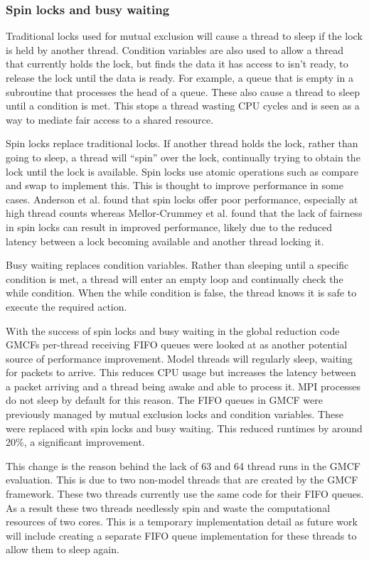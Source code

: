 \subsubsection{Spin locks and busy waiting}

Traditional locks used for mutual exclusion will cause a thread to sleep if the
lock is held by another thread. Condition variables are also used to allow a
thread that currently holds the lock, but finds the data it has access to isn't
ready, to release the lock until the data is ready. For example, a queue that is
empty in a subroutine that processes the head of a queue. These also cause a
thread to sleep until a condition is met. This stops a thread wasting CPU cycles
and is seen as a way to mediate fair access to a shared resource.

Spin locks replace traditional locks. If another thread holds the lock, rather
than going to sleep, a thread will ``spin'' over the lock, continually trying to
obtain the lock until the lock is available. Spin locks use atomic operations
such as compare and swap to implement this. This is thought to improve
performance in some cases. Anderson et al. \cite{Anderson1990} found that spin
locks offer poor performance, especially at high thread counts whereas
Mellor-Crummey et al. \cite{Mellor-Crummey1991} found that the lack of fairness
in spin locks can result in improved performance, likely due to the reduced
latency between a lock becoming available and another thread locking it.

Busy waiting replaces condition variables. Rather than sleeping until a specific
condition is met, a thread will enter an empty loop and continually check the
while condition. When the while condition is false, the thread knows it is safe
to execute the required action.

With the success of spin locks and busy waiting in the global reduction code
GMCFs per-thread receiving FIFO queues were looked at as another potential
source of performance improvement. Model threads will regularly sleep, waiting
for packets to arrive. This reduces CPU usage but increases the latency between
a packet arriving and a thread being awake and able to process it. MPI processes
do not sleep by default for this reason. The FIFO queues in GMCF were previously
managed by mutual exclusion locks and condition variables. These were replaced
with spin locks and busy waiting. This reduced runtimes by around 20\%, a
significant improvement.

This change is the reason behind the lack of 63 and 64 thread runs in the GMCF
evaluation. This is due to two non-model threads that are created by the GMCF
framework. These two threads currently use the same code for their FIFO queues.
As a result these two threads needlessly spin and waste the computational
resources of two cores. This is a temporary implementation detail as future work
will include creating a separate FIFO queue implementation for these threads to
allow them to sleep again.


